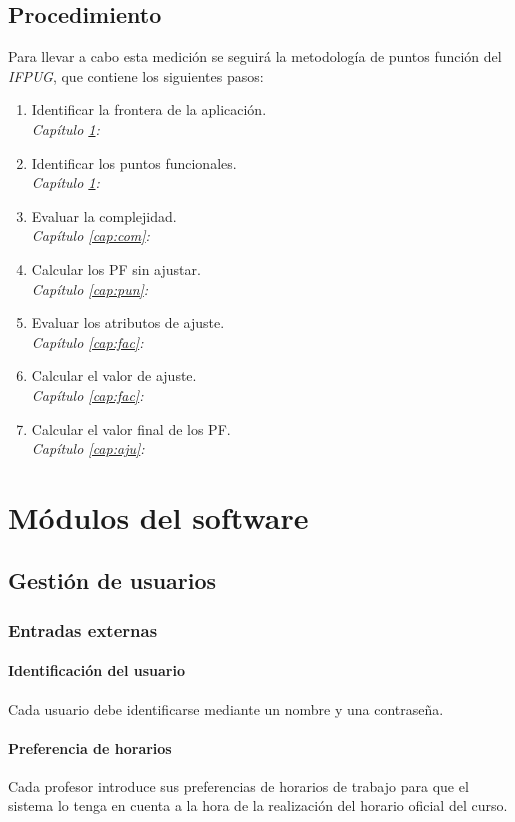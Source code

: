 \documentclass[11pt,a4paper,spanish,twoside]{book}
\begin{document}
\section*{Procedimiento}
Para llevar a cabo esta medición se seguirá la metodología de puntos función
del \emph{IFPUG}, que contiene los siguientes pasos:
\begin{enumerate}
\item Identificar la frontera de la aplicación. \\
  \emph{Capítulo \ref{cap:mod}: }
\item Identificar los puntos funcionales. \\
  \emph{Capítulo \ref{cap:mod}: }
\item Evaluar la complejidad. \\
  \emph{Capítulo \ref{cap:com}: }
\item Calcular los PF sin ajustar. \\
  \emph{Capítulo \ref{cap:pun}: } 
\item Evaluar los atributos de ajuste. \\ 
  \emph{Capítulo \ref{cap:fac}: } 
\item Calcular el valor de ajuste. \\
  \emph{Capítulo \ref{cap:fac}: } 
\item Calcular el valor final de los PF. \\
  \emph{Capítulo \ref{cap:aju}: }
\end{enumerate}

\chapter{Módulos del software} \label{cap:mod}
\section{Gestión de usuarios}
\subsection{Entradas externas}
\subsubsection{Identificación del usuario}
Cada usuario debe identificarse mediante un nombre y una contraseña.

\subsubsection{Preferencia de horarios} 
Cada profesor introduce sus preferencias de horarios de trabajo para que el
sistema lo tenga en cuenta a la hora de la realización del horario oficial
del curso.
\end{document}
